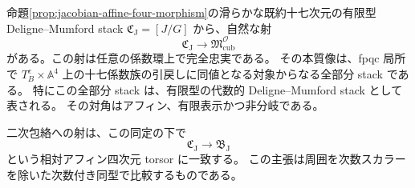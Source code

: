 \begin{theorem}
\label{thm:jacobian-algebraic-abel-substack}
命題\ref{prop:jacobian-affine-four-morphism}の滑らかな既約十七次元の有限型
Deligne--Mumford stack $\mathfrak C_{\mathrm J}=[J/G]$ から、自然な射
\begin{equation}\label{eq:jacobian-abel-fully-faithful}
 \mathfrak C_{\mathrm J}\longrightarrow
 \mathfrak M^{\mathcal O}_{\mathrm{cub}}
\end{equation}
がある。この射は任意の係数環上で完全忠実である。
その本質像は、fpqc 局所で
$T_B^e\times\mathbb A^4$ 上の十七係数族の引戻しに同値となる対象からなる全部分 stack である。
特にこの全部分 stack は、有限型の代数的 Deligne--Mumford stack として表される。
その対角はアフィン、有限表示かつ非分岐である。

二次包絡への射は、この同定の下で
\[
 \mathfrak C_{\mathrm J}\longrightarrow\mathfrak B_{\mathrm J}
\]
という相対アフィン四次元 torsor に一致する。
この主張は周囲を次数スカラーを除いた次数付き同型で比較するものである。
\end{theorem}

